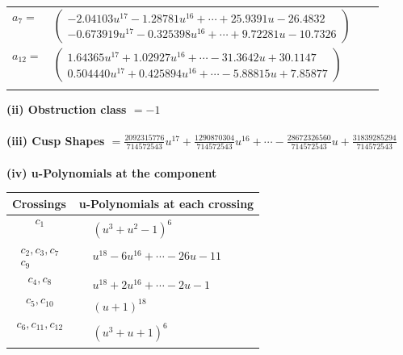 \documentclass[1p]{elsarticle_modified}
\theoremstyle{definition}
\begin{document}
\begin{tabular}{m{7pt} m{180pt} m{7pt} m{180pt} }
\flushright $a_{7}=$&$\begin{pmatrix}-2.04103 u^{17}-1.28781 u^{16}+\cdots+25.9391 u-26.4832\\-0.673919 u^{17}-0.325398 u^{16}+\cdots+9.72281 u-10.7326\end{pmatrix}$ \\
\flushright $a_{12}=$&$\begin{pmatrix}1.64365 u^{17}+1.02927 u^{16}+\cdots-31.3642 u+30.1147\\0.504440 u^{17}+0.425894 u^{16}+\cdots-5.88815 u+7.85877\end{pmatrix}$\\&\end{tabular}
\flushleft \textbf{(ii) Obstruction class $= -1$}\\~\\
\flushleft \textbf{(iii) Cusp Shapes $= \frac{2092315776}{714572543} u^{17}+\frac{1290870304}{714572543} u^{16}+\cdots-\frac{28672326560}{714572543} u+\frac{31839285294}{714572543}$}\\~\\
\newpage\renewcommand{\arraystretch}{1}
\flushleft \textbf{(iv) u-Polynomials at the component}\newline \\
\begin{tabular}{m{50pt}|m{274pt}}
Crossings & \hspace{64pt}u-Polynomials at each crossing \\
\hline $$\begin{aligned}c_{1}\end{aligned}$$&$\begin{aligned}
&(u^3+u^2-1)^6
\end{aligned}$\\
\hline $$\begin{aligned}c_{2},c_{3},c_{7}\\c_{9}\end{aligned}$$&$\begin{aligned}
&u^{18}-6 u^{16}+\cdots-26 u-11
\end{aligned}$\\
\hline $$\begin{aligned}c_{4},c_{8}\end{aligned}$$&$\begin{aligned}
&u^{18}+2 u^{16}+\cdots-2 u-1
\end{aligned}$\\
\hline $$\begin{aligned}c_{5},c_{10}\end{aligned}$$&$\begin{aligned}
&(u+1)^{18}
\end{aligned}$\\
\hline $$\begin{aligned}c_{6},c_{11},c_{12}\end{aligned}$$&$\begin{aligned}
&(u^3+u+1)^6
\end{aligned}$\\
\hline
\end{tabular}\\~\\
\end{document}
